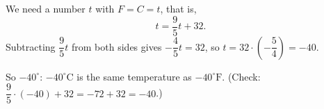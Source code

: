 We need a number $t$ with $F=C=t$, that is,
\[t=\dfrac{9}{5}t+32.\]
Subtracting $\dfrac{9}{5}t$ from both sides gives $-\dfrac{4}{5}t=32$, so $t=32\cdot\left(-\dfrac{5}{4}\right)=-40$.

So $\boxed{-40^\circ}$: $-40^\circ\text{C}$ is the same temperature as $-40^\circ\text{F}$. (Check: $\dfrac{9}{5}\cdot(-40)+32=-72+32=-40$.)
